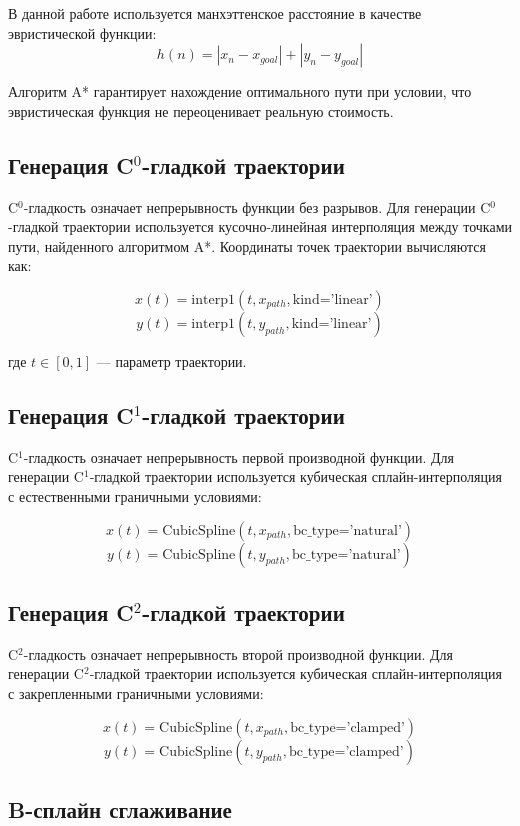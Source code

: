 В данной работе используется манхэттенское расстояние в качестве эвристической функции:
$$h(n) = |x_n - x_{goal}| + |y_n - y_{goal}|$$

Алгоритм A* гарантирует нахождение оптимального пути при условии, что эвристическая функция не переоценивает реальную стоимость.

\subsection{Генерация C$^0$-гладкой траектории}

C$^0$-гладкость означает непрерывность функции без разрывов. Для генерации C$^0$-гладкой траектории используется кусочно-линейная интерполяция между точками пути, найденного алгоритмом A*. Координаты точек траектории вычисляются как:

$$x(t) = \text{interp1}(t, x_{path}, \text{kind='linear'})$$
$$y(t) = \text{interp1}(t, y_{path}, \text{kind='linear'})$$

где $t \in [0, 1]$ --- параметр траектории.

\subsection{Генерация C$^1$-гладкой траектории}

C$^1$-гладкость означает непрерывность первой производной функции. Для генерации C$^1$-гладкой траектории используется кубическая сплайн-интерполяция с естественными граничными условиями:

$$x(t) = \text{CubicSpline}(t, x_{path}, \text{bc\_type='natural'})$$
$$y(t) = \text{CubicSpline}(t, y_{path}, \text{bc\_type='natural'})$$

\subsection{Генерация C$^2$-гладкой траектории}

C$^2$-гладкость означает непрерывность второй производной функции. Для генерации C$^2$-гладкой траектории используется кубическая сплайн-интерполяция с закрепленными граничными условиями:

$$x(t) = \text{CubicSpline}(t, x_{path}, \text{bc\_type='clamped'})$$
$$y(t) = \text{CubicSpline}(t, y_{path}, \text{bc\_type='clamped'})$$

\subsection{B-сплайн сглаживание}


